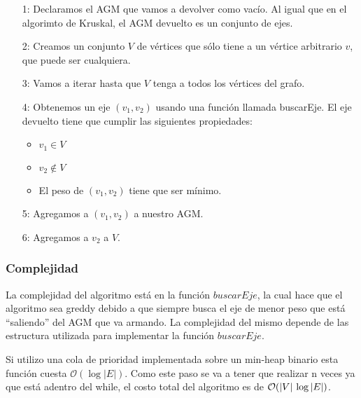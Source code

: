 \begin{enumerate}
\item [1:] Declaramos el AGM que vamos a devolver como vac\'io. Al igual que en el algorimto de Kruskal, el AGM devuelto es un conjunto de ejes.
\item [2:] Creamos un conjunto $V$ de v\'ertices que s\'olo tiene a un v\'ertice arbitrario $v$, que puede ser cualquiera.
\item [3:] Vamos a iterar hasta que $V$ tenga a todos los v\'ertices del grafo.
\item [4:] Obtenemos un eje $(v_1, v_2)$ usando una funci\'on llamada buscarEje. El eje devuelto tiene que cumplir las siguientes propiedades:
  \begin{itemize}
  \item $v_1 \in V$
  \item $v_2 \not \in V$
  \item El peso de $(v_1, v_2)$ tiene que ser m\'inimo.
  \end{itemize}
\item [5:] Agregamos a $(v_1, v_2)$ a nuestro AGM.
\item [6:] Agregamos a $v_2$ a $V$.
\end{enumerate}

\subsubsection*{Complejidad}

La complejidad del algoritmo est\'a en la funci\'on $buscarEje$, la cual hace que el algoritmo sea greddy debido a que siempre busca el eje de menor peso que est\'a ``saliendo'' del AGM que va armando. La complejidad del mismo depende de las estructura utilizada para implementar la funci\'on $buscarEje$.

Si utilizo una cola de prioridad implementada sobre un min-heap binario esta funci\'on cuesta $\mathcal{O}(\log{}|E|)$. Como este paso se va a tener que realizar n veces ya que est\'a adentro del while, el costo total del algoritmo es de $\mathcal{O}(|V|\hspace{2px}\log{}|E|)$.
